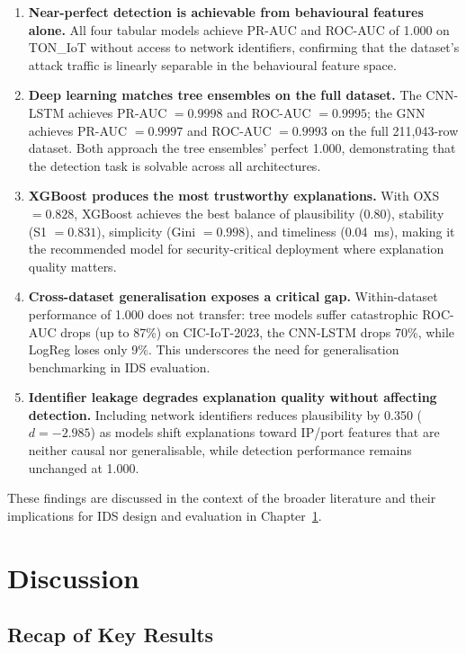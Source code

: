 \documentclass[12pt,a4paper]{report}
\begin{document}
\begin{enumerate}
  \item \textbf{Near-perfect detection is achievable from behavioural features alone.} All four tabular models achieve PR-AUC and ROC-AUC of 1.000 on TON\_IoT without access to network identifiers, confirming that the dataset's attack traffic is linearly separable in the behavioural feature space.
  \item \textbf{Deep learning matches tree ensembles on the full dataset.} The CNN-LSTM achieves PR-AUC $= 0.9998$ and ROC-AUC $= 0.9995$; the GNN achieves PR-AUC $= 0.9997$ and ROC-AUC $= 0.9993$ on the full 211,043-row dataset. Both approach the tree ensembles' perfect 1.000, demonstrating that the detection task is solvable across all architectures.
  \item \textbf{XGBoost produces the most trustworthy explanations.} With OXS $= 0.828$, XGBoost achieves the best balance of plausibility (0.80), stability (S1 $= 0.831$), simplicity (Gini $= 0.998$), and timeliness (0.04~ms), making it the recommended model for security-critical deployment where explanation quality matters.
  \item \textbf{Cross-dataset generalisation exposes a critical gap.} Within-dataset performance of 1.000 does not transfer: tree models suffer catastrophic ROC-AUC drops (up to 87\%) on CIC-IoT-2023, the CNN-LSTM drops 70\%, while LogReg loses only 9\%. This underscores the need for generalisation benchmarking in IDS evaluation.
  \item \textbf{Identifier leakage degrades explanation quality without affecting detection.} Including network identifiers reduces plausibility by 0.350 ($d = -2.985$) as models shift explanations toward IP/port features that are neither causal nor generalisable, while detection performance remains unchanged at 1.000.
\end{enumerate}

These findings are discussed in the context of the broader literature and their implications for IDS design and evaluation in Chapter~\ref{ch:discussion}.

\chapter{Discussion}
\label{ch:discussion}

\section{Recap of Key Results}
\label{sec:recap}
\end{document}
